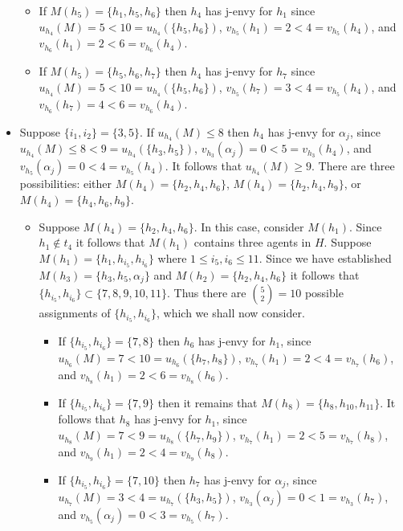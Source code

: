 \begin{itemize}
\begin{itemize}
    \item If $M(h_5) = \{ h_1, h_5, h_6 \}$ then $h_4$ has j-envy for $h_1$ since $u_{h_4}(M) = 5 < 10 = u_{h_4}(\{ h_5, h_6 \})$, $v_{h_5}(h_1) = 2 < 4 = v_{h_5}(h_4)$, and $v_{h_6}(h_1) = 2 < 6 = v_{h_6}(h_4)$.
    \item If $M(h_5) = \{ h_5, h_6, h_7 \}$ then $h_4$ has j-envy for $h_7$ since $u_{h_4}(M) = 5 < 10 = u_{h_4}(\{ h_5, h_6 \})$, $v_{h_5}(h_7) = 3 < 4 = v_{h_5}(h_4)$, and $v_{h_6}(h_7) = 4 < 6 = v_{h_6}(h_4)$.
\end{itemize}
\item Suppose $\{ {i_1}, {i_2} \} = \{ 3, 5 \}$. If $u_{h_4}(M) \leq 8$ then $h_4$ has j-envy for $\alpha_{j}$, since $u_{h_4}(M) \leq 8 < 9 = u_{h_4}(\{ h_3, h_5 \})$, $v_{h_3}(\alpha_{j}) = 0 < 5 = v_{h_3}(h_4)$, and $v_{h_5}(\alpha_{j}) = 0 < 4 = v_{h_5}(h_4)$. It follows that $u_{h_4}(M) \geq 9$. There are three possibilities: either $M(h_4) = \{ h_2, h_4, h_6 \}$, $M(h_4) = \{ h_2, h_4, h_9 \}$, or $M(h_4) = \{ h_4, h_6, h_9 \}$.
\begin{itemize}
    \item Suppose $M(h_4) = \{ h_2, h_4, h_6 \}$. In this case, consider $M(h_1)$. Since $h_1 \notin t_4$ it follows that $M(h_1)$ contains three agents in $H$. Suppose $M(h_1) = \{ h_1, h_{i_5}, h_{i_6} \}$ where $1 \leq {i_5}, {i_6} \leq 11$. Since we have established $M(h_3) = \{ h_3, h_5, \alpha_{j} \}$ and $M(h_2) = \{ h_2, h_4, h_6 \}$ it follows that $\{ h_{i_5}, h_{i_6} \} \subset \{ 7, 8, 9, 10, 11 \}$. Thus there are $\binom{5}{2}=10$ possible assignments of $\{ h_{i_5}, h_{i_6} \}$, which we shall now consider.
    \begin{itemize}
        \item If $\{ h_{i_5}, h_{i_6} \} = \{ 7, 8 \}$ then $h_6$ has j-envy for $h_1$, since $u_{h_6}(M) = 7 < 10 = u_{h_6}(\{ h_7, h_8 \})$, $v_{h_7}(h_1) = 2 < 4 = v_{h_7}(h_6)$, and $v_{h_8}(h_1) = 2 < 6 = v_{h_8}(h_6)$.
        \item If $\{ h_{i_5}, h_{i_6} \} = \{ 7, 9 \}$ then it remains that $M(h_8) = \{ h_8, h_{10}, h_{11} \}$. It follows that $h_8$ has j-envy for $h_1$, since $u_{h_8}(M) = 7 < 9 = u_{h_8}(\{ h_7, h_9 \})$, $v_{h_7}(h_1) = 2 < 5 = v_{h_7}(h_8)$, and $v_{h_9}(h_1) = 2 < 4 = v_{h_9}(h_8)$.
        \item If $\{ h_{i_5}, h_{i_6} \} = \{ 7, 10 \}$ then $h_7$ has j-envy for $\alpha_{j}$, since $u_{h_7}(M) = 3 < 4 = u_{h_7}(\{ h_3, h_5 \})$, $v_{h_3}(\alpha_{j}) = 0 < 1 = v_{h_3}(h_7)$, and $v_{h_5}(\alpha_{j}) = 0 < 3 = v_{h_5}(h_7)$.

\end{itemize}
\end{itemize}
\end{itemize}
